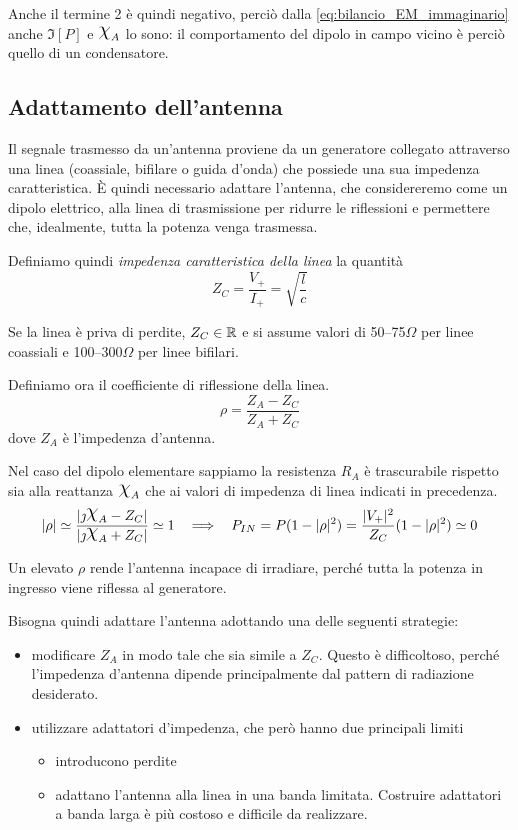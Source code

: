 Anche il termine 2 è quindi negativo, perciò dalla \autoref{eq:bilancio_EM_immaginario} anche $\Im[P]$ e $\Chi_A$ lo sono: il comportamento del dipolo in campo vicino è perciò quello di un condensatore.

\subsection{Adattamento dell'antenna}
Il segnale trasmesso da un'antenna proviene da un generatore collegato attraverso una linea (coassiale, bifilare o guida d'onda) che possiede una sua impedenza caratteristica. È quindi necessario adattare l'antenna, che considereremo come un dipolo elettrico, alla linea di trasmissione per ridurre le riflessioni e permettere che, idealmente, tutta la potenza venga trasmessa.

Definiamo quindi \emph{impedenza caratteristica della linea} la quantità
\begin{equation}
	Z_C = \frac{V_+}{I_+} = \sqrt{\frac{l}{c}}
\end{equation}

Se la linea è priva di perdite, $Z_C \in \mathbb{R}$ e si assume valori di 50--75$\Omega$ per linee coassiali e 100--300$\Omega$ per linee bifilari.

Definiamo ora il coefficiente di riflessione della linea.
\begin{equation}
	\rho = \frac{Z_A -Z_C}{Z_A + Z_C}
\end{equation}
dove $Z_A$ è l'impedenza d'antenna.

Nel caso del dipolo elementare sappiamo la resistenza $R_A$ è trascurabile rispetto sia alla reattanza $\Chi_A$ che ai valori di impedenza di linea indicati in precedenza.
\begin{equation*}
	|\rho|
	\simeq \frac{|\jmath \Chi_A -Z_C|}{|\jmath \Chi_A +Z_C|}
	\simeq 1
	~~ \implies ~~
	P_{IN}
	= P(1-|\rho|^2)
	= \frac{|V_+|^2}{Z_C}(1-|\rho|^2) \simeq 0
\end{equation*}

Un elevato $\rho$ rende l'antenna incapace di irradiare, perché tutta la potenza in ingresso viene riflessa al generatore.

Bisogna quindi adattare l'antenna adottando una delle seguenti strategie:
\begin{itemize}
	\item modificare $Z_A$ in modo tale che sia simile a $Z_C$. Questo è difficoltoso, perché l'impedenza d'antenna dipende principalmente dal pattern di radiazione desiderato.
	\item utilizzare adattatori d'impedenza, che però hanno due principali limiti
	\begin{itemize}
		\item introducono perdite
		\item adattano l'antenna alla linea in una banda limitata. Costruire adattatori a banda larga è più costoso e difficile da realizzare.
	\end{itemize}
\end{itemize}

